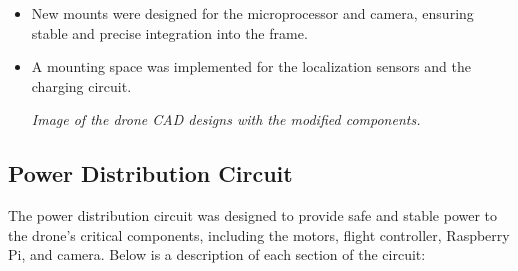         \begin{itemize} 
            \item New mounts were designed for the microprocessor and camera, ensuring stable and precise integration into the frame. 
            \item A mounting space was implemented for the localization sensors and the charging circuit. 
            \begin{center} 
                \textit{Image of the drone CAD designs with the modified components.} 
            \end{center} 
        \end{itemize}
    
        \subsection{Power Distribution Circuit} 
        The power distribution circuit was designed to provide safe and stable power to the drone's critical components, including the motors, flight controller, Raspberry Pi, and camera. Below is a description of each section of the circuit:
    
